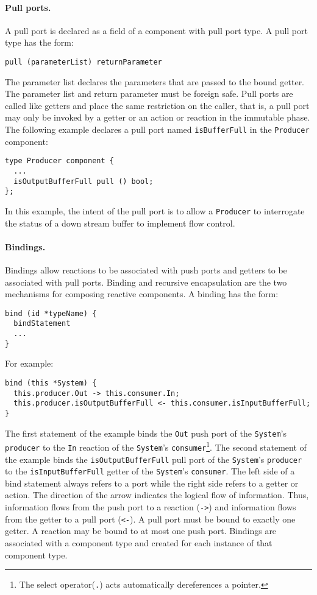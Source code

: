 \paragraph{Pull ports.}
A pull port is declared as a field of a component with pull port type.
A pull port type has the form:
\begin{verbatim}
pull (parameterList) returnParameter
\end{verbatim}
The parameter list declares the parameters that are passed to the bound getter.
The parameter list and return parameter must be foreign safe.
Pull ports are called like getters and place the same restriction on the caller, that is, a pull port may only be invoked by a getter or an action or reaction in the immutable phase.
The following example declares a pull port named \verb+isBufferFull+ in the \verb+Producer+ component:
\begin{verbatim}
type Producer component {
  ...
  isOutputBufferFull pull () bool;
};
\end{verbatim}
In this example, the intent of the pull port is to allow a \verb+Producer+ to interrogate the status of a down stream buffer to implement flow control.

\paragraph{Bindings.}
Bindings allow reactions to be associated with push ports and getters to be associated with pull ports.
Binding and recursive encapsulation are the two mechanisms for composing reactive components.
A binding has the form:
\begin{verbatim}
bind (id *typeName) {
  bindStatement
  ...
}
\end{verbatim}
For example:
\begin{verbatim}
bind (this *System) {
  this.producer.Out -> this.consumer.In;
  this.producer.isOutputBufferFull <- this.consumer.isInputBufferFull;
}
\end{verbatim}
The first statement of the example binds the \verb+Out+ push port of the \verb+System+'s \verb+producer+ to the \verb+In+ reaction of the \verb+System+'s \verb+consumer+\footnote{The select operator(\texttt{.}) acts automatically dereferences a pointer.}.
The second statement of the example binds the \verb+isOutputBufferFull+ pull port of the \verb+System+'s \verb+producer+ to the \verb+isInputBufferFull+ getter of the \verb+System+'s \verb+consumer+.
The left side of a bind statement always refers to a port while the right side refers to a getter or action.
The direction of the arrow indicates the logical flow of information.
Thus, information flows from the push port to a reaction (\verb+->+) and information flows from the getter to a pull port (\verb+<-+).
A pull port must be bound to exactly one getter.
A reaction may be bound to at most one push port.
Bindings are associated with a component type and created for each instance of that component type.

